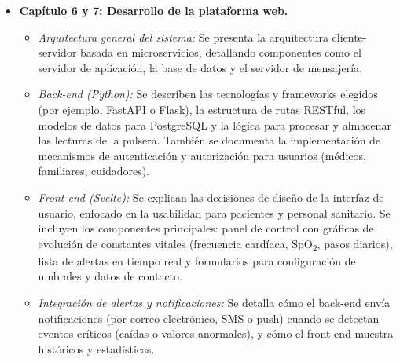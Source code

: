 \documentclass[12pt, a4paper]{article}
\begin{document}
\begin{itemize}
		\item \textbf{Capítulo 6 y 7: Desarrollo de la plataforma web.}  
		\begin{itemize}
			\item \emph{Arquitectura general del sistema:} Se presenta la arquitectura cliente-servidor basada en microservicios, detallando componentes como el servidor de aplicación, la base de datos y el servidor de mensajería.  
			\item \emph{Back-end (Python):} Se describen las tecnologías y frameworks elegidos (por ejemplo, FastAPI o Flask), la estructura de rutas RESTful, los modelos de datos para PostgreSQL y la lógica para procesar y almacenar las lecturas de la pulsera. También se documenta la implementación de mecanismos de autenticación y autorización para usuarios (médicos, familiares, cuidadores).  
			\item \emph{Front-end (Svelte):} Se explican las decisiones de diseño de la interfaz de usuario, enfocado en la usabilidad para pacientes y personal sanitario. Se incluyen los componentes principales: panel de control con gráficas de evolución de constantes vitales (frecuencia cardíaca, SpO\textsubscript{2}, pasos diarios), lista de alertas en tiempo real y formularios para configuración de umbrales y datos de contacto.  
			\item \emph{Integración de alertas y notificaciones:} Se detalla cómo el back-end envía notificaciones (por correo electrónico, SMS o push) cuando se detectan eventos críticos (caídas o valores anormales), y cómo el front-end muestra históricos y estadísticas.  
		\end{itemize}
		

\end{itemize}
\end{document}
